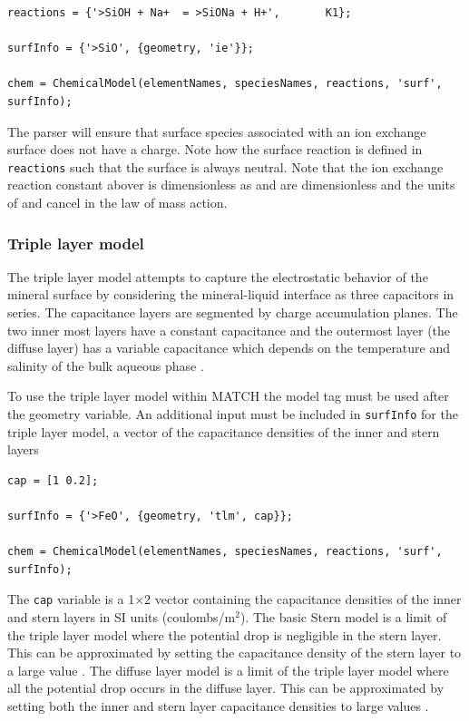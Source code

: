 \documentclass{article}
\begin{document}
\begin{lstlisting}
reactions = {'>SiOH + Na+  = >SiONa + H+',       K1};
            
surfInfo = {'>SiO', {geometry, 'ie'}};

chem = ChemicalModel(elementNames, speciesNames, reactions, 'surf', surfInfo);
\end{lstlisting}
The parser will ensure that surface species associated with an ion exchange surface does not have a charge. Note how the surface reaction is defined in \verb|reactions| such that the surface is always neutral.  Note that the ion exchange reaction constant abover is dimensionless as  and  are dimensionless and the units of  and  cancel in the law of mass action. 

\subsubsection{Triple layer model}
The triple layer model attempts to capture the electrostatic behavior of the mineral surface by considering the mineral-liquid interface as three capacitors in series. The capacitance layers are segmented by charge accumulation planes. The two inner most layers have a constant capacitance and the outermost layer (the diffuse layer) has a variable capacitance which depends on the temperature and salinity of the bulk aqueous phase \cite{McNeece2016, westall1980, Hiemstra1989a}{}.

To use the triple layer model within MATCH the model tag  must be used after the geometry variable. An additional input must be included in \verb|surfInfo| for the triple layer model, a vector of the capacitance densities of the inner and stern layers

\begin{lstlisting}
cap = [1 0.2];

surfInfo = {'>FeO', {geometry, 'tlm', cap}};

chem = ChemicalModel(elementNames, speciesNames, reactions, 'surf', surfInfo);
\end{lstlisting}
The \verb|cap| variable is a 1$\times$2 vector containing the capacitance densities of the inner and stern layers in SI units (coulombs/m$^2$). The basic Stern model is a limit of the triple layer model where the potential drop is negligible in the stern layer. This can be approximated by setting the capacitance density of the stern layer to a large value . The diffuse layer model is a limit of the triple layer model where all the potential drop occurs in the diffuse layer. This can be approximated by setting both the inner and stern layer capacitance densities to large values .
\end{document}
